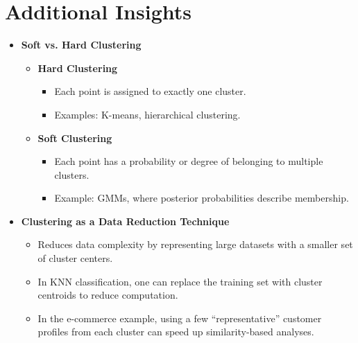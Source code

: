 \documentclass[10pt]{article}
\begin{document}
\section{Additional Insights}
\begin{itemize}
    \item \textbf{Soft vs. Hard Clustering}
    \begin{itemize}
        \item \textbf{Hard Clustering}
        \begin{itemize}
            \item Each point is assigned to exactly one cluster.
            \item Examples: K-means, hierarchical clustering.
        \end{itemize}
        \item \textbf{Soft Clustering}
        \begin{itemize}
            \item Each point has a probability or degree of belonging to multiple clusters.
            \item Example: GMMs, where posterior probabilities describe membership.
        \end{itemize}
    \end{itemize}
    \item \textbf{Clustering as a Data Reduction Technique}
    \begin{itemize}
        \item Reduces data complexity by representing large datasets with a smaller set of cluster centers.
        \item In KNN classification, one can replace the training set with cluster centroids to reduce computation.
        \item In the e-commerce example, using a few “representative” customer profiles from each cluster can speed up similarity-based analyses.
    \end{itemize}
\end{itemize}
\end{document}
